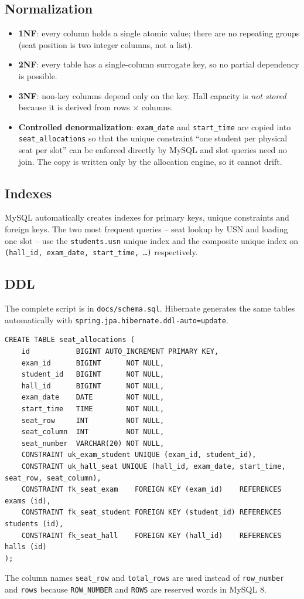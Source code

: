 \documentclass[11pt,a4paper]{article}
\begin{document}
\subsection{Normalization}
\begin{itemize}
  \item \textbf{1NF}: every column holds a single atomic value; there are no repeating groups (seat position is two integer columns, not a list).
  \item \textbf{2NF}: every table has a single-column surrogate key, so no partial dependency is possible.
  \item \textbf{3NF}: non-key columns depend only on the key. Hall capacity is \emph{not stored} because it is derived from rows $\times$ columns.
  \item \textbf{Controlled denormalization}: \texttt{exam\_date} and \texttt{start\_time} are copied into \texttt{seat\_allocations} so that the unique constraint ``one student per physical seat per slot'' can be enforced directly by MySQL and slot queries need no join. The copy is written only by the allocation engine, so it cannot drift.
\end{itemize}

\subsection{Indexes}
MySQL automatically creates indexes for primary keys, unique constraints and foreign keys. The two most frequent queries -- seat lookup by USN and loading one slot -- use the \texttt{students.usn} unique index and the composite unique index on \texttt{(hall\_id, exam\_date, start\_time, \ldots)} respectively.

\subsection{DDL}
The complete script is in \texttt{docs/schema.sql}. Hibernate generates the same tables automatically with \texttt{spring.jpa.hibernate.ddl-auto=update}.
\begin{lstlisting}[style=sql]
CREATE TABLE seat_allocations (
    id           BIGINT AUTO_INCREMENT PRIMARY KEY,
    exam_id      BIGINT      NOT NULL,
    student_id   BIGINT      NOT NULL,
    hall_id      BIGINT      NOT NULL,
    exam_date    DATE        NOT NULL,
    start_time   TIME        NOT NULL,
    seat_row     INT         NOT NULL,
    seat_column  INT         NOT NULL,
    seat_number  VARCHAR(20) NOT NULL,
    CONSTRAINT uk_exam_student UNIQUE (exam_id, student_id),
    CONSTRAINT uk_hall_seat UNIQUE (hall_id, exam_date, start_time, seat_row, seat_column),
    CONSTRAINT fk_seat_exam    FOREIGN KEY (exam_id)    REFERENCES exams (id),
    CONSTRAINT fk_seat_student FOREIGN KEY (student_id) REFERENCES students (id),
    CONSTRAINT fk_seat_hall    FOREIGN KEY (hall_id)    REFERENCES halls (id)
);
\end{lstlisting}
\begin{notebox}
The column names \texttt{seat\_row} and \texttt{total\_rows} are used instead of \texttt{row\_number} and \texttt{rows} because \texttt{ROW\_NUMBER} and \texttt{ROWS} are reserved words in MySQL 8.
\end{notebox}
\end{document}
